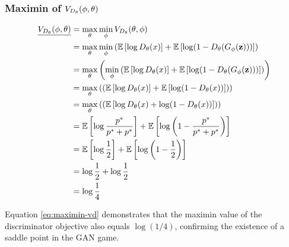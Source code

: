 \subsubsection{Maximin of $V_{D_\theta}(\phi, \theta)$}
\label{sec:maximin-vd}
\begin{align}
  \underline{V_{D_\theta}(\phi, \theta)} & =
                     \max_{\mathbf{\theta}}\min_{\mathbf{\phi}}V_{D_\theta}(\theta,
                     \phi) \nonumber \\
                   & =
                     \max_{\mathbf{\theta}}\min_{\mathbf{\phi}} \left(
                     \mathbb{E}\left[\log{D_\theta(x)}\right] +
                     \mathbb{E}\left[\log(1 - D_\theta(G_\phi(\mathbf{z})))\right]\right) \nonumber \\
                   & = \max_{\mathbf{\theta}}\left(\min_{\mathbf{\phi}} \left(
                     \mathbb{E}\left[\log{D_\theta(x)}\right] +
                     \mathbb{E}\left[\log(1 -
                     D_\theta(G_\phi(\mathbf{z})))\right]\right)\right) \nonumber \\
                   & = \max_{\mathbf{\theta}}\left(\left(
                     \mathbb{E}\left[\log{D_\theta(x)}\right] +
                     \mathbb{E}\left[\log(1 -
                     D_\theta(x))\right]\right)\right) \nonumber \\
                   & = \max_{\mathbf{\theta}}\left(\left(
                     \mathbb{E}\left[\log{D_\theta(x)} +
                     \log(1 - D_\theta(x))\right]\right)\right) \nonumber \\
                   & = \mathbb{E}\left[\log{p^*\over p^*+ p^*}\right]
                     + \mathbb{E}\left[\log\left(1 - {p^* \over p^* + p^*}\right)\right] \nonumber \\
                   & = \mathbb{E}\left[\log{1 \over 2}\right] + \mathbb{E}\left[\log{\left(1 - {1 \over 2}\right)}\right] \nonumber \\
                   & = \log{1 \over 2} + \log{1 \over 2} \nonumber \\
                   & = \log{1 \over 4} \label{eq:maximin-vd}
\end{align}

Equation \ref{eq:maximin-vd} demonstrates that the maximin value of the discriminator objective also equals $\log(1/4)$, confirming the existence of a saddle point in the GAN game.

